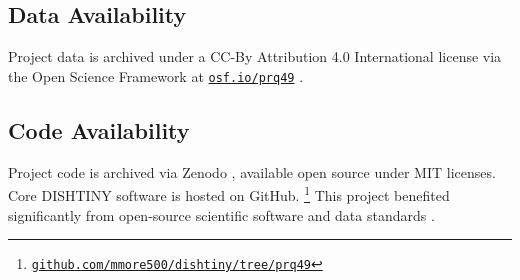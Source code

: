 \subsection{Data Availability}

Project data is archived under a CC-By Attribution 4.0 International license via the Open Science Framework at \href{https://osf.io/prq49}{\texttt{osf.io/prq49}} \citep{foster2017open,moreno2026osf}.

\subsection{Code Availability}

Project code is archived via Zenodo \citep{moreno_2025_16990564,zenodo2013}, available open source under MIT licenses.
Core DISHTINY software is hosted on GitHub.
\unskip\footnote{
\href{https://github.com/mmore500/dishtiny/tree/prq49}{\texttt{github.com/mmore500/dishtiny/tree/prq49}}
}
This project benefited significantly from open-source scientific software and data standards \citep{2020SciPy-NMeth,harris2020array,reback2020pandas,mckinney-proc-scipy-2010,waskom2021seaborn,hunter2007matplotlib,moreno2023teeplot,seabold2010statsmodels,vostinar2024empirical,moreno2021signalgp,moreno2021conduit,cock2009biopython,lalejini2019data}.
